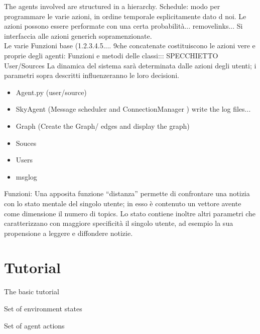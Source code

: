 \documentclass[11pt]{article} %
\begin{document}
The agents involved are structured in a hierarchy. 
Schedule: modo per programmare le varie azioni, in ordine temporale esplicitamente dato d noi.  Le azioni possono essere performate con una certa probabilità... removelinks...
Si interfaccia alle azioni generich sopramenzionate.
\\
Le varie Funzioni base (1.2.3.4.5....  9che concatenate costituiscono le azioni vere e proprie degli agenti: Funzioni e metodi delle classi::: SPECCHIETTO
User/Sources
La dinamica del sistema sarà determinata dalle azioni degli utenti; i parametri sopra descritti
influenzeranno le loro decisioni.
\begin{itemize}
\item Agent.py   (user/source) 
\item SkyAgent  (Message scheduler and ConnectionManager ) write the log files...
\item Graph (Create the Graph/ edges and display the graph)
\item Souces
\item Users

\item msglog
\end{itemize}
Funzioni:
Una apposita funzione “distanza” permette di confrontare una notizia con lo stato mentale del
singolo utente; in esso è contenuto un vettore avente come dimensione il numero di topics. Lo stato
contiene inoltre altri parametri che caratterizzano con maggiore specificità il singolo utente, ad
esempio la sua propensione a leggere e diffondere notizie.

\section{Tutorial}
The basic tutorial 


 Set of environment states

 Set of agent actions
\end{document}

